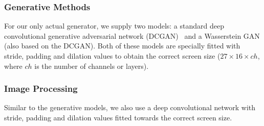 
\subsubsection{Generative Methods}

For our only actual generator, we supply two models: a standard deep
convolutional generative adversarial network
(DCGAN)~\cite{radfordUnsupervisedRepresentationLearning2016} and a
Wasserstein GAN (also based on the DCGAN). Both of these models are
specially fitted with stride, padding and dilation values to obtain
the correct screen size ($27 \times 16 \times ch$, where $ch$ is the
number of channels or layers).

\subsubsection{Image Processing}

Similar to the generative models, we also use a deep convolutional
network with stride, padding and dilation values fitted towards the
correct screen size.



